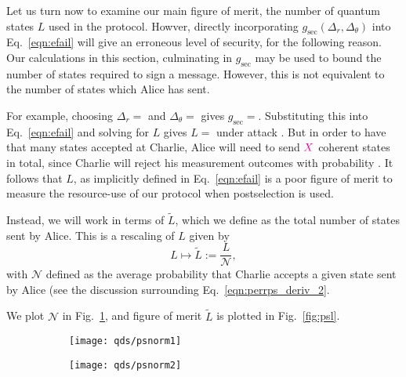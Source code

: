 
Let us turn now to examine our main figure of merit, the number of quantum states $L$ used in the protocol. Howver, directly incorporating $g_{\text{sec}}\left(\Delta_r, \Delta_\theta\right)$ into Eq.~\ref{eqn:efail} will give an erroneous level of security, for the following reason. Our calculations in this section, culminating in $g_{\text{sec}}$ may be used to bound the number of states required to sign a message. However, this is not equivalent to the number of states which Alice has sent. 

For example, choosing $\Delta_r = $ and $\Delta_\theta = $ gives $g_{\text{sec}} = $. Substituting this into Eq.~\ref{eqn:efail} and solving for $L$ gives $L = $ under attack . But in order to have that many states accepted at Charlie, Alice will need to send $\textcolor{magenta}{X}$ coherent states in total, since Charlie will reject his measurement outcomes with probability . It follows that $L$, as implicitly defined in Eq.~\ref{eqn:efail} is a poor figure of merit to measure the resource-use of our protocol when postselection is used.

Instead, we will work in terms of $\tilde{L}$, which we define as the total number of states sent by Alice. This is a rescaling of $L$ given by
\begin{equation}
L \mapsto \tilde{L} := \frac{L}{\mathcal{N}},
\end{equation}
with $\mathcal{N}$ defined as the average probability that Charlie accepts a given state sent by Alice (see the discussion surrounding Eq.~\ref{eqn:perrps_deriv_2}. 

We plot $\mathcal{N}$ in Fig.~\ref{fig:psnorm}, and figure of merit $\tilde{L}$ is plotted in Fig.~\ref{fig:psl}.  

\begin{figure}[htp]
\centering
\begin{subfigure}{0.4\linewidth}
\texttt{[image: qds/psnorm1]}
\caption{}
\end{subfigure}
\begin{subfigure}{0.4\linewidth}
\texttt{[image: qds/psnorm2]}
\caption{}
\end{subfigure}
\caption{\label{fig:psnorm}}
\end{figure}

